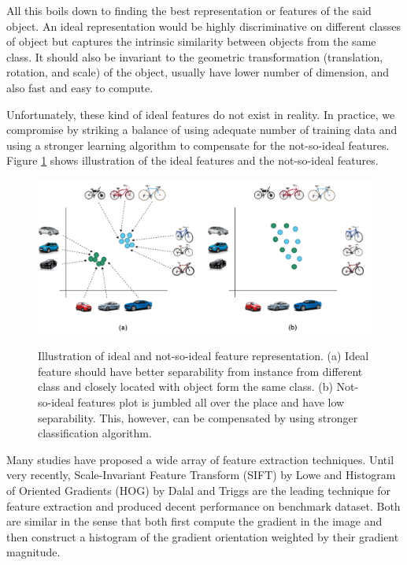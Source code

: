\documentclass[a4paper,11pt]{kth-mag}
\begin{document}
All this boils down to finding the best representation or features of the said object. An ideal representation would be highly discriminative on different classes of object but captures the intrinsic similarity between objects from the same class. It should also be invariant to the geometric transformation (translation, rotation, and scale) of the object, usually have lower number of dimension, and also fast and easy to compute.

Unfortunately, these kind of ideal features do not exist in reality. In practice, we compromise by striking a balance of using adequate number of training data and using a stronger learning algorithm to compensate for the not-so-ideal features. Figure \ref{fig:feature} shows illustration of the ideal features and the not-so-ideal features.

\begin{figure}[h]
\centering
\includegraphics[scale=0.4]{image/ideal_feature.png}
\label{fig:feature}
\caption{Illustration of ideal and not-so-ideal feature representation. (a) Ideal feature should have better separability from instance from different class and closely located with object form the same class. (b) Not-so-ideal features plot is jumbled all over the place and have low separability. This, however, can be compensated by using stronger classification algorithm.}
\end{figure}

Many studies have proposed a wide array of feature extraction techniques. Until very recently, Scale-Invariant Feature Transform (SIFT) by Lowe \cite{lowe2004sift} and Histogram of Oriented Gradients (HOG) by Dalal and Triggs \cite{dalal2005hog} are the leading technique for feature extraction and produced decent performance on benchmark dataset. Both are similar in the sense that both first compute the gradient in the image and then construct a histogram of the gradient orientation weighted by their gradient magnitude.
\end{document}
